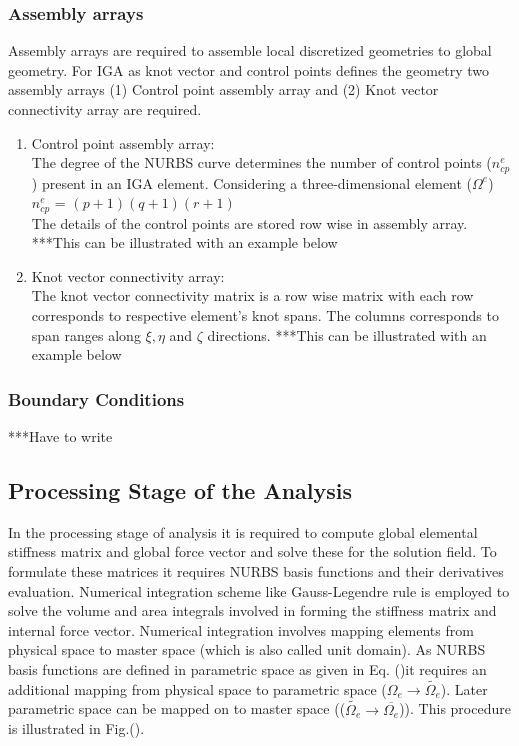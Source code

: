 \documentclass[12pt]{article}
\begin{document}
\subsubsection{Assembly arrays}
Assembly arrays are required to assemble local discretized geometries to global geometry. For IGA as knot vector and control points defines the geometry two assembly arrays (1) Control point assembly array and (2) Knot vector connectivity array are required.
\begin{enumerate}[leftmargin=*]
\item Control point assembly array: \\
The degree of the NURBS curve determines the number of control points ($n^e_{cp}$) present in an IGA element.
Considering a three-dimensional element ($\Omega^e$)\\
$n^e_{cp}$ = $(p+1)(q+1)(r+1)$ \\
The details of the control points are stored row wise in assembly array.
***This can be illustrated with an example below
\item Knot vector connectivity array: \\
The knot vector connectivity matrix is a row wise matrix with each row corresponds to respective element's knot spans. The columns corresponds to span ranges along $\xi, \eta$ and $\zeta$ directions.
***This can be illustrated with an example below
\end{enumerate}
\subsubsection{Boundary Conditions}
***Have to write 


\subsection{Processing Stage of the Analysis}
In the processing stage of analysis it is required to compute global elemental stiffness matrix and global force vector and solve these for the solution field. To formulate these matrices it requires NURBS basis functions and their derivatives evaluation. Numerical integration scheme like Gauss-Legendre rule is employed to solve the volume and area integrals involved in forming the stiffness matrix and internal force vector. Numerical integration involves mapping elements from physical space to master space (which is also called unit domain). As NURBS basis functions are defined in parametric space as given in Eq. ()it requires an additional mapping from physical space to parametric space ($\Omega_e \rightarrow \widetilde{\Omega_e}$). Later parametric space can be mapped on to master space (($\widetilde{\Omega_e} \rightarrow \overline{\Omega_e}$)). This procedure is illustrated in Fig.().
\end{document}
